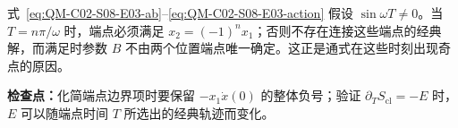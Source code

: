 \begin{checkedsolution}
式~\eqref{eq:QM-C02-S08-E03-ab}--\eqref{eq:QM-C02-S08-E03-action} 假设 $\sin\omega T\neq0$。当 $T=n\pi/\omega$ 时，端点必须满足 $x_2=(-1)^n x_1$；否则不存在连接这些端点的经典解，而满足时参数 $B$ 不由两个位置端点唯一确定。这正是通式在这些时刻出现奇点的原因。
\end{checkedsolution}

\textbf{检查点：}化简端点边界项时要保留 $-x_1\dot x(0)$ 的整体负号；验证 $\partial_T S_{\mathrm{cl}}=-E$ 时，$E$ 可以随端点时间 $T$ 所选出的经典轨迹而变化。
